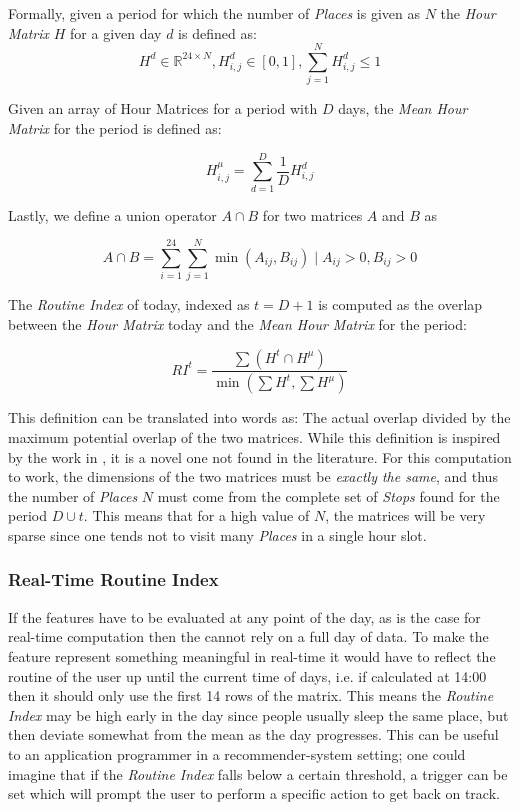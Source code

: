 Formally, given a period for which the number of \textit{Places} is given as $N$ the \textit{Hour Matrix} $H$ for a given day $d$ is defined as:
$$H^d \in \mathbb{R}^{24 \times N}, H^d_{i,j} \in [0,1], \sum_{j=1}^N H^d_{i,j} \leq 1$$

Given an array of Hour Matrices for a period with $D$ days, the \textit{Mean Hour Matrix} for the period is defined as:

$$H^{\mu}_{i,j} = \sum_{d=1}^D \frac{1}{D} H^d_{i,j}$$

Lastly, we define a union operator $A \cap B$ for two matrices $A$ and $B$ as 

$$A \cap B = \sum_{i=1}^{24} \sum_{j=1}^{N} \min (A_{ij}, B_{ij}) \;|\; A_{ij} > 0, B_{ij} > 0$$

The \textit{Routine Index} of today, indexed as $t=D+1$ is computed as the overlap between the \textit{Hour Matrix} today and the \textit{Mean Hour Matrix} for the period:

$$RI^{t} = \frac{\sum (H^t \cap H^{\mu})}{\min (\sum H^t, \sum H^{\mu})}$$

This definition can be translated into words as: The actual overlap divided by the maximum potential overlap of the two matrices. While this definition is inspired by the work in \cite{Canzian2015}, it is a novel one not found in the literature. For this computation to work, the dimensions of the two matrices must be \textit{exactly the same}, and thus the number of \textit{Places} $N$ must come from the complete set of \textit{Stops} found for the period $D \cup t$. This means that for a high value of $N$, the matrices will be very sparse since one tends not to visit many \textit{Places} in a single hour slot.

\subsubsection*{Real-Time Routine Index}
If the features have to be evaluated at any point of the day, as is the case for real-time computation then the  cannot rely on a full day of data. To make the feature represent something meaningful in real-time it would have to reflect the routine of the user up until the current time of days, i.e. if calculated at 14:00 then it should only use the first 14 rows of the matrix. This means the \textit{Routine Index} may be high early in the day since people usually sleep the same place, but then deviate somewhat from the mean as the day progresses. This can be useful to an application programmer in a recommender-system setting; one could imagine that if the \textit{Routine Index} falls below a certain threshold, a trigger can be set which will prompt the user to perform a specific action to get back on track.

